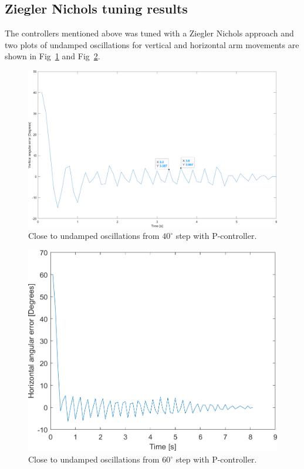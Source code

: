 \subsection{Ziegler Nichols tuning results}
\label{sec:simon17}
The controllers mentioned above was tuned with a Ziegler Nichols approach and two plots of undamped oscillations for vertical and horizontal arm movements are shown in  Fig~\ref{vert_osc} and Fig~\ref{Hor_osc}.
\begin{figure}[h]
\centering
\includegraphics[width=\linewidth]{sections/assets/Vertical_undamped_oscillation.png}
\caption{Close to undamped oscillations from \(40^{\circ}\) step with P-controller.}
\label{vert_osc}
\end{figure}
\begin{figure}[h]
\centering
\includegraphics[width=\linewidth]{sections/assets/Horizontal_undamped_oscillation.png}
\caption{Close to undamped oscillations from \(60^{\circ}\) step with P-controller.}
\label{Hor_osc}
\end{figure}
